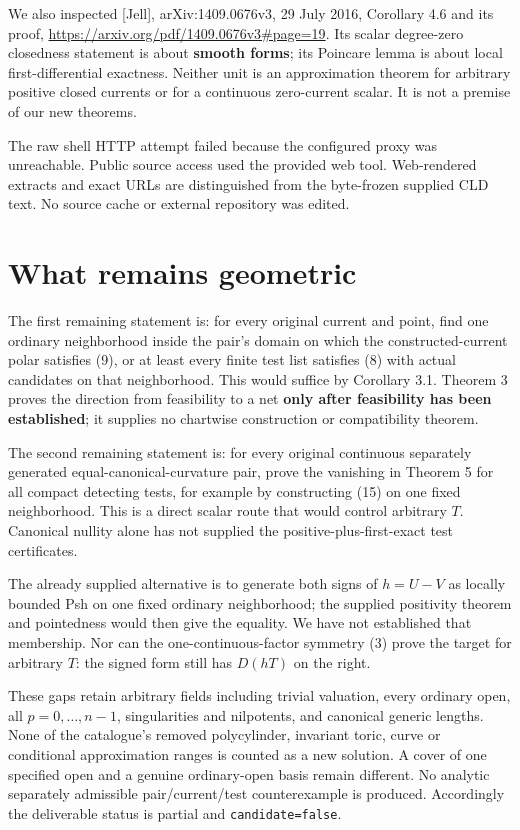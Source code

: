 \documentclass[
  11pt,
]{article}
\begin{document}
We also inspected {[}Jell{]}, arXiv:1409.0676v3, 29 July 2016, Corollary
4.6 and its proof, \url{https://arxiv.org/pdf/1409.0676v3\#page=19}. Its
scalar degree-zero closedness statement is about \textbf{smooth forms};
its Poincare lemma is about local first-differential exactness. Neither
unit is an approximation theorem for arbitrary positive closed currents
or for a continuous zero-current scalar. It is not a premise of our new
theorems.

The raw shell HTTP attempt failed because the configured proxy was
unreachable. Public source access used the provided web tool.
Web-rendered extracts and exact URLs are distinguished from the
byte-frozen supplied CLD text. No source cache or external repository
was edited.

\section{What remains geometric}\label{what-remains-geometric}

The first remaining statement is: for every original current and point,
find one ordinary neighborhood inside the pair's domain on which the
constructed-current polar satisfies (9), or at least every finite test
list satisfies (8) with actual candidates on that neighborhood. This
would suffice by Corollary 3.1. Theorem 3 proves the direction from
feasibility to a net \textbf{only after feasibility has been
established}; it supplies no chartwise construction or compatibility
theorem.

The second remaining statement is: for every original continuous
separately generated equal-canonical-curvature pair, prove the vanishing
in Theorem 5 for all compact detecting tests, for example by
constructing (15) on one fixed neighborhood. This is a direct scalar
route that would control arbitrary \(T\). Canonical nullity alone has
not supplied the positive-plus-first-exact test certificates.

The already supplied alternative is to generate both signs of \(h=U-V\)
as locally bounded Psh on one fixed ordinary neighborhood; the supplied
positivity theorem and pointedness would then give the equality. We have
not established that membership. Nor can the one-continuous-factor
symmetry (3) prove the target for arbitrary \(T\): the signed form still
has \(D(hT)\) on the right.

These gaps retain arbitrary fields including trivial valuation, every
ordinary open, all \(p=0,\ldots,n-1\), singularities and nilpotents, and
canonical generic lengths. None of the catalogue's removed polycylinder,
invariant toric, curve or conditional approximation ranges is counted as
a new solution. A cover of one specified open and a genuine
ordinary-open basis remain different. No analytic separately admissible
pair/current/test counterexample is produced. Accordingly the
deliverable status is partial and \texttt{candidate=false}.
\end{document}
